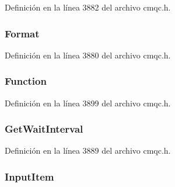 Definición en la línea 3882 del archivo cmqc.\+h.

\hypertarget{structtag_m_q_c_i_h_a435a478822008713f8aaff89f369ed63}{}
\subsubsection[{Format}]{ Format}\label{structtag_m_q_c_i_h_a435a478822008713f8aaff89f369ed63}


Definición en la línea 3880 del archivo cmqc.\+h.

\hypertarget{structtag_m_q_c_i_h_ac6036114cd0e0587d88b4b79e299bdf2}{}
\subsubsection[{Function}]{ Function}\label{structtag_m_q_c_i_h_ac6036114cd0e0587d88b4b79e299bdf2}


Definición en la línea 3899 del archivo cmqc.\+h.

\hypertarget{structtag_m_q_c_i_h_ae69ea53c11f44cb893f742fe41d67b9d}{}
\subsubsection[{Get\+Wait\+Interval}]{ Get\+Wait\+Interval}\label{structtag_m_q_c_i_h_ae69ea53c11f44cb893f742fe41d67b9d}


Definición en la línea 3889 del archivo cmqc.\+h.

\hypertarget{structtag_m_q_c_i_h_a128f45cdb324e9a71685582323dd2ead}{}
\subsubsection[{Input\+Item}]{ Input\+Item}\label{structtag_m_q_c_i_h_a128f45cdb324e9a71685582323dd2ead}



